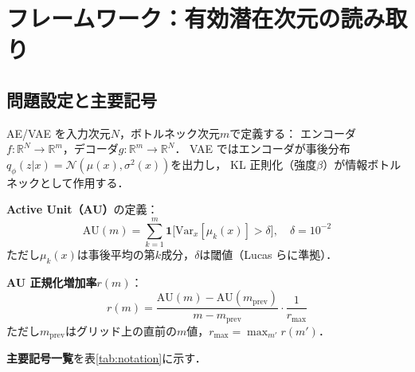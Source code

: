 \documentclass[11pt,a4paper]{jsarticle}
\newcommand{\R}{\mathbb{R}}
\begin{document}
\section{フレームワーク：有効潜在次元の読み取り}\label{sec:framework}

\subsection{問題設定と主要記号}\label{sec:framework_setup}

AE/VAE を入力次元$N$，ボトルネック次元$m$で定義する：
エンコーダ$f: \R^N \to \R^m$，デコーダ$g: \R^m \to \R^N$．
VAE ではエンコーダが事後分布$q_\phi(z|x) = \mathcal{N}(\mu(x), \sigma^2(x))$を出力し，
KL 正則化（強度$\beta$）が情報ボトルネックとして作用する．

\textbf{Active Unit（AU）}の定義：
\begin{equation}
  \mathrm{AU}(m) = \sum_{k=1}^{m} \mathbf{1}\bigl[\mathrm{Var}_x[\mu_k(x)] > \delta\bigr],
  \quad \delta = 10^{-2}
  \label{eq:au_def}
\end{equation}
ただし$\mu_k(x)$は事後平均の第$k$成分，$\delta$は閾値（Lucas ら\cite{lucas2019elbo}に準拠）．

\textbf{AU 正規化増加率}$r(m)$：
\begin{equation}
  r(m) = \frac{\mathrm{AU}(m) - \mathrm{AU}(m_{\mathrm{prev}})}{m - m_{\mathrm{prev}}} \cdot \frac{1}{r_{\max}}
  \label{eq:au_rate}
\end{equation}
ただし$m_{\mathrm{prev}}$はグリッド上の直前の$m$値，$r_{\max} = \max_{m'} r(m')$．

\textbf{主要記号一覧}を表\ref{tab:notation}に示す．
\end{document}
